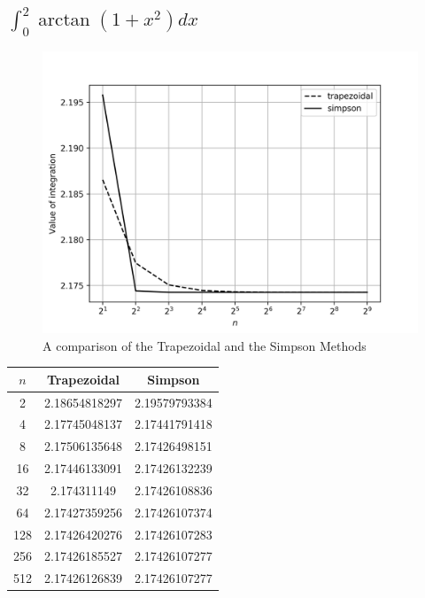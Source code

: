 \documentclass[12,a4paper]{article}
\begin{document}
    \subsection{$\int_0^2 \arctan(1+x^2)dx$}
    \begin{figure}[H]
        \centering
        \includegraphics[width=\textwidth]{plots/q2b.png}
        \caption{A comparison of the Trapezoidal and the Simpson Methods}
        \label{fig:my_label}
    \end{figure}
    \begin{table}[H]
        \centering
        \begin{tabular}{ |c|c|c| }
            \hline
            $n$ & \textbf{Trapezoidal} & \textbf{Simpson}\\
            \hline
            2 & 2.18654818297 & 2.19579793384 \\
            4 & 2.17745048137 & 2.17441791418 \\
            8 & 2.17506135648 & 2.17426498151 \\
            16 & 2.17446133091 & 2.17426132239 \\
            32 & 2.174311149 & 2.17426108836 \\
            64 & 2.17427359256 & 2.17426107374 \\
            128 & 2.17426420276 & 2.17426107283 \\
            256 & 2.17426185527 & 2.17426107277 \\
            512 & 2.17426126839 & 2.17426107277 \\
            \hline
        \end{tabular}
    \end{table}
    \newpage
\end{document}
